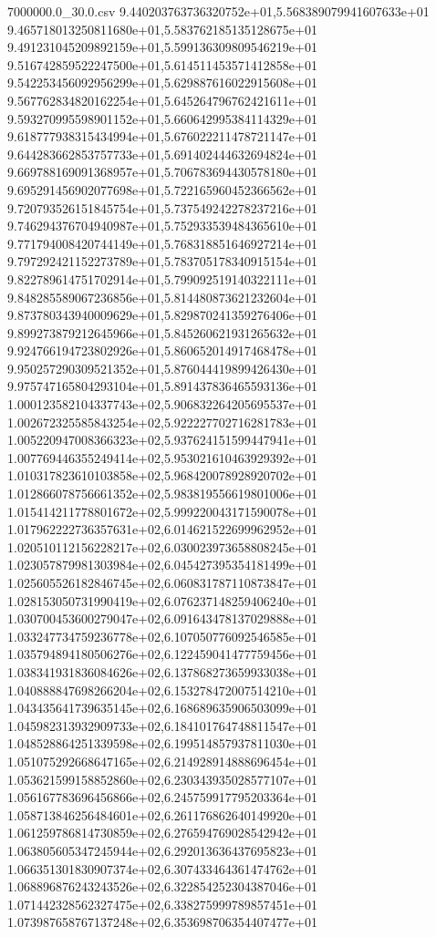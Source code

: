 \begin{filecontents*}{7000000.0_30.0.csv}
9.440203763736320752e+01,5.568389079941607633e+01
9.465718013250811680e+01,5.583762185135128675e+01
9.491231045209892159e+01,5.599136309809546219e+01
9.516742859522247500e+01,5.614511453571412858e+01
9.542253456092956299e+01,5.629887616022915608e+01
9.567762834820162254e+01,5.645264796762421611e+01
9.593270995598901152e+01,5.660642995384114329e+01
9.618777938315434994e+01,5.676022211478721147e+01
9.644283662853757733e+01,5.691402444632694824e+01
9.669788169091368957e+01,5.706783694430578180e+01
9.695291456902077698e+01,5.722165960452366562e+01
9.720793526151845754e+01,5.737549242278237216e+01
9.746294376704940987e+01,5.752933539484365610e+01
9.771794008420744149e+01,5.768318851646927214e+01
9.797292421152273789e+01,5.783705178340915154e+01
9.822789614751702914e+01,5.799092519140322111e+01
9.848285589067236856e+01,5.814480873621232604e+01
9.873780343940009629e+01,5.829870241359276406e+01
9.899273879212645966e+01,5.845260621931265632e+01
9.924766194723802926e+01,5.860652014917468478e+01
9.950257290309521352e+01,5.876044419899426430e+01
9.975747165804293104e+01,5.891437836465593136e+01
1.000123582104337743e+02,5.906832264205695537e+01
1.002672325585843254e+02,5.922227702716281783e+01
1.005220947008366323e+02,5.937624151599447941e+01
1.007769446355249414e+02,5.953021610463929392e+01
1.010317823610103858e+02,5.968420078928920702e+01
1.012866078756661352e+02,5.983819556619801006e+01
1.015414211778801672e+02,5.999220043171590078e+01
1.017962222736357631e+02,6.014621522699962952e+01
1.020510112156228217e+02,6.030023973658808245e+01
1.023057879981303984e+02,6.045427395354181499e+01
1.025605526182846745e+02,6.060831787110873847e+01
1.028153050731990419e+02,6.076237148259406240e+01
1.030700453600279047e+02,6.091643478137029888e+01
1.033247734759236778e+02,6.107050776092546585e+01
1.035794894180506276e+02,6.122459041477759456e+01
1.038341931836084626e+02,6.137868273659933038e+01
1.040888847698266204e+02,6.153278472007514210e+01
1.043435641739635145e+02,6.168689635906503099e+01
1.045982313932909733e+02,6.184101764748811547e+01
1.048528864251339598e+02,6.199514857937811030e+01
1.051075292668647165e+02,6.214928914888696454e+01
1.053621599158852860e+02,6.230343935028577107e+01
1.056167783696456866e+02,6.245759917795203364e+01
1.058713846256484601e+02,6.261176862640149920e+01
1.061259786814730859e+02,6.276594769028542942e+01
1.063805605347245944e+02,6.292013636437695823e+01
1.066351301830907374e+02,6.307433464361474762e+01
1.068896876243243526e+02,6.322854252304387046e+01
1.071442328562327475e+02,6.338275999789857451e+01
1.073987658767137248e+02,6.353698706354407477e+01

\end{filecontents*}
